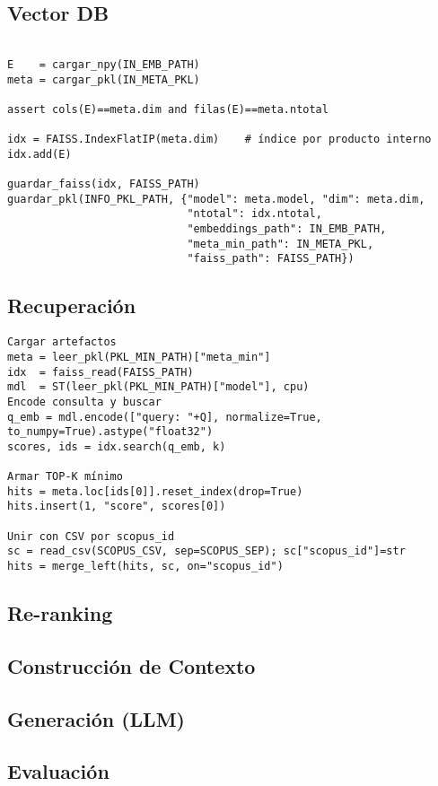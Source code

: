 \subsection{Vector DB}
\begin{verbatim}

E    = cargar_npy(IN_EMB_PATH)      
meta = cargar_pkl(IN_META_PKL)       

assert cols(E)==meta.dim and filas(E)==meta.ntotal

idx = FAISS.IndexFlatIP(meta.dim)    # índice por producto interno
idx.add(E)

guardar_faiss(idx, FAISS_PATH)
guardar_pkl(INFO_PKL_PATH, {"model": meta.model, "dim": meta.dim,
                            "ntotal": idx.ntotal,
                            "embeddings_path": IN_EMB_PATH,
                            "meta_min_path": IN_META_PKL,
                            "faiss_path": FAISS_PATH})
\end{verbatim}


\subsection{Recuperación}
\begin{verbatim}
Cargar artefactos
meta = leer_pkl(PKL_MIN_PATH)["meta_min"]         
idx  = faiss_read(FAISS_PATH)
mdl  = ST(leer_pkl(PKL_MIN_PATH)["model"], cpu)   
Encode consulta y buscar
q_emb = mdl.encode(["query: "+Q], normalize=True, to_numpy=True).astype("float32")
scores, ids = idx.search(q_emb, k)

Armar TOP-K mínimo
hits = meta.loc[ids[0]].reset_index(drop=True)
hits.insert(1, "score", scores[0])

Unir con CSV por scopus_id
sc = read_csv(SCOPUS_CSV, sep=SCOPUS_SEP); sc["scopus_id"]=str
hits = merge_left(hits, sc, on="scopus_id")
\end{verbatim}

\subsection{Re-ranking}

\subsection{Construcción de Contexto}

\subsection{Generación (LLM)}

\subsection{Evaluación}
